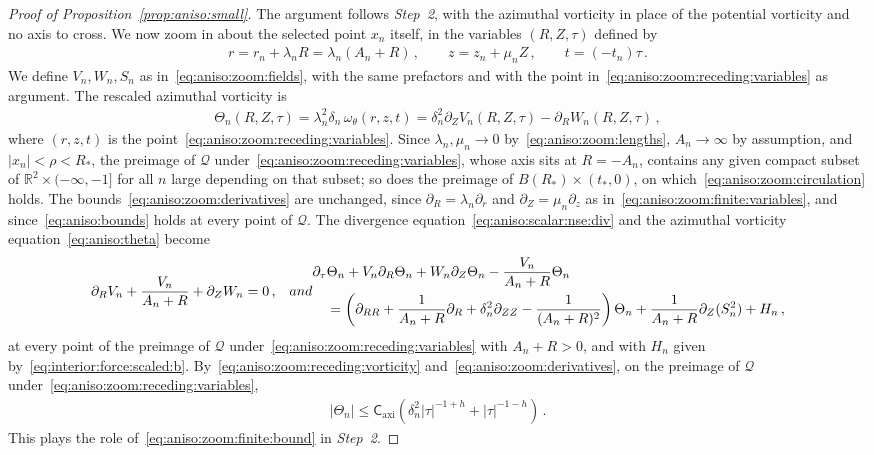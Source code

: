 \documentclass[11pt,reqno]{amsproc}
\numberwithin{equation}{section}
\theoremstyle{remark}
\newcommand{\p}{\partial}
\newcommand{\RR}{\mathbb R}
\newcommand{\Caxi}{\mathsf{C}_{\mathrm{axi}}}
\begin{document}
\begin{proof}[Proof of Proposition~\ref{prop:aniso:small}]
The argument follows \emph{Step~2}, with the azimuthal vorticity in place of the potential vorticity and no axis to cross. We now zoom in about the selected point $x_n$ itself, in the variables $(R,Z,\tau)$ defined by
\begin{align}
r=r_n+\lambda_nR=\lambda_n(A_n+R)
\,,\qquad z=z_n+\mu_nZ
\,,\qquad t=(-t_n)\tau
\,.
\label{eq:aniso:zoom:receding:variables}
\end{align}
We define $V_n,W_n,S_n$ as in~\eqref{eq:aniso:zoom:fields}, with the same prefactors and with the point in~\eqref{eq:aniso:zoom:receding:variables} as argument. The rescaled azimuthal vorticity is
\begin{align}
\Theta_n(R,Z,\tau) =\lambda_n^2\delta_n \, \omega_\theta(r,z,t)
=\delta_n^2 \p_Z V_n(R,Z,\tau) -\p_R W_n(R,Z,\tau)
\,,
\label{eq:aniso:zoom:receding:vorticity}
\end{align}
where $(r,z,t)$ is the point~\eqref{eq:aniso:zoom:receding:variables}.
Since $\lambda_n,\mu_n\to0$ by~\eqref{eq:aniso:zoom:lengths}, $A_n\to\infty$ by assumption, and $|x_n|<\rho<R_*$, the preimage of $\mathcal Q$ under~\eqref{eq:aniso:zoom:receding:variables}, whose axis sits at $R=-A_n$, contains any given compact subset of $\RR^2\times(-\infty,-1]$ for all $n$ large depending on that subset; so does the preimage of $B(R_*)\times(t_*,0)$, on which~\eqref{eq:aniso:zoom:circulation} holds. The bounds~\eqref{eq:aniso:zoom:derivatives} are unchanged, since $\p_R=\lambda_n\p_r$ and $\p_Z=\mu_n\p_z$ as in~\eqref{eq:aniso:zoom:finite:variables}, and since~\eqref{eq:aniso:bounds} holds at every point of $\mathcal Q$. The divergence equation~\eqref{eq:aniso:scalar:nse:div} and the azimuthal vorticity equation~\eqref{eq:aniso:theta} become
\begin{subequations}
\label{eq:aniso:zoom:receding}
\begin{align}
\p_RV_n+\frac{V_n}{A_n+R}+\p_ZW_n&=0
\,,
\label{eq:aniso:zoom:receding:div}
\end{align}
and
\begin{align}
&\p_\tau\Theta_n+V_n\p_R\Theta_n+W_n\p_Z\Theta_n
-\frac{V_n}{A_n+R}\Theta_n
\notag\\
&\quad =\left(\p_{RR}+\frac1{A_n+R}\p_R
+\delta_n^2\p_{ZZ}-\frac1{(A_n+R)^2}\right)\Theta_n
+\frac1{A_n+R}\p_Z(S_n^2)+H_n
\,,
\label{eq:aniso:zoom:receding:equation}
\end{align}
\end{subequations}
at every point of the preimage of $\mathcal Q$ under~\eqref{eq:aniso:zoom:receding:variables} with $A_n+R>0$, and with $H_n$ given by~\eqref{eq:interior:force:scaled:b}.
By~\eqref{eq:aniso:zoom:receding:vorticity} and~\eqref{eq:aniso:zoom:derivatives}, on the preimage of $\mathcal Q$ under~\eqref{eq:aniso:zoom:receding:variables},
\begin{align}
|\Theta_n|
\le \Caxi\left(\delta_n^2|\tau|^{-1+h}+|\tau|^{-1-h}\right)
\,.
\label{eq:aniso:zoom:receding:bound}
\end{align}
This plays the role of~\eqref{eq:aniso:zoom:finite:bound} in \emph{Step~2}.


\end{proof}
\end{document}
